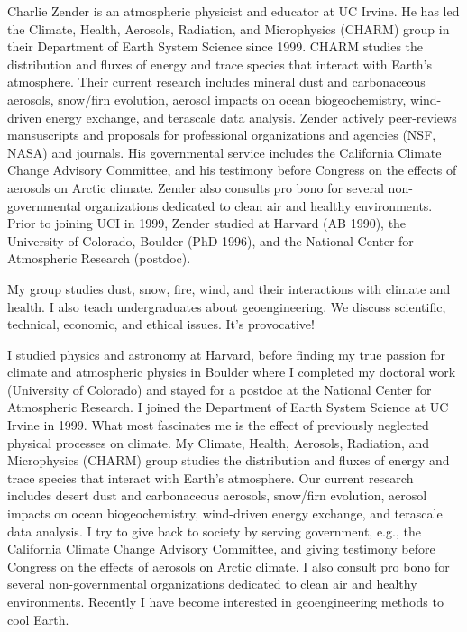 \documentclass[12pt,twoside]{article}
\begin{document}
{{{%
Charlie Zender is an atmospheric physicist and educator at UC Irvine.
He has led the Climate, Health, Aerosols, Radiation, and Microphysics
(CHARM) group in their Department of Earth System Science since 1999.
CHARM studies the distribution and fluxes of energy and trace species
that interact with Earth's atmosphere. Their current research includes
mineral dust and carbonaceous aerosols, snow/firn evolution, aerosol
impacts on ocean biogeochemistry, wind-driven energy exchange, and
terascale data analysis.  Zender actively peer-reviews mansuscripts
and proposals for professional organizations and agencies (NSF, NASA)
and journals. His governmental service includes the California Climate
Change Advisory Committee, and his testimony before Congress on the
effects of aerosols on Arctic climate.  Zender also consults pro bono
for several non-governmental organizations dedicated to clean air and
healthy environments.  Prior to joining UCI in 1999, Zender studied at
Harvard (AB 1990), the University of Colorado, Boulder (PhD 1996), and
the National Center for Atmospheric Research (postdoc).

My group studies dust, snow, fire, wind, and their interactions with 
climate and health. I also teach undergraduates about geoengineering.
We discuss scientific, technical, economic, and ethical issues.
It's provocative!

I studied physics and astronomy at Harvard, before finding my true
passion for climate and atmospheric physics in Boulder where I
completed my doctoral work (University of Colorado) and stayed for a 
postdoc at the National Center for Atmospheric Research.
I joined the Department of Earth System Science at UC Irvine in 1999.
What most fascinates me is the effect of previously neglected physical
processes on climate. My Climate, Health, Aerosols, Radiation, and
Microphysics (CHARM) group studies the distribution and fluxes of
energy and trace species that interact with Earth's atmosphere. 
Our current research includes desert dust and carbonaceous aerosols,
snow/firn evolution, aerosol impacts on ocean biogeochemistry,
wind-driven energy exchange, and terascale data analysis. 
I try to give back to society by serving government, e.g., the
California Climate Change Advisory Committee, and giving testimony
before Congress on the effects of aerosols on Arctic climate.  
I also consult pro bono for several non-governmental organizations
dedicated to clean air and healthy environments. Recently I have
become interested in geoengineering methods to cool Earth.

}}}
\end{document}
